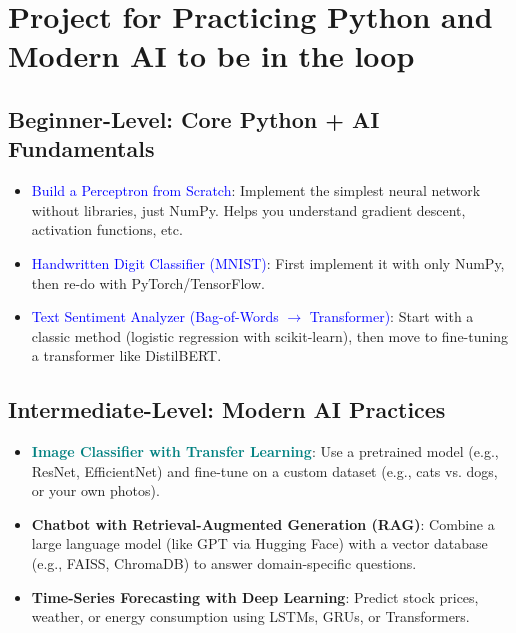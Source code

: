 \documentclass{article}
\begin{document}
\section{Project for Practicing Python and Modern AI to be in the loop}

\subsection*{Beginner-Level: Core Python + AI Fundamentals}
\begin{itemize}
    \item \textcolor{blue}{Build a Perceptron from Scratch}: Implement the simplest neural network without libraries, just NumPy. Helps you understand gradient descent, activation functions, etc.
    \item \textcolor{blue}{Handwritten Digit Classifier (MNIST)}: First implement it with only NumPy, then re-do with PyTorch/TensorFlow.
    \item \textcolor{blue}{Text Sentiment Analyzer (Bag-of-Words $\rightarrow$ Transformer)}: Start with a classic method (logistic regression with scikit-learn), then move to fine-tuning a transformer like DistilBERT.
\end{itemize}

\subsection*{Intermediate-Level: Modern AI Practices}
\begin{itemize}
    \item {\textbf{\textcolor{teal}{Image Classifier with Transfer Learning}}}: Use a pretrained model (e.g., ResNet, EfficientNet) and fine-tune on a custom dataset (e.g., cats vs. dogs, or your own photos).
    \item \textbf{Chatbot with Retrieval-Augmented Generation (RAG)}: Combine a large language model (like GPT via Hugging Face) with a vector database (e.g., FAISS, ChromaDB) to answer domain-specific questions.
    \item \textbf{Time-Series Forecasting with Deep Learning}: Predict stock prices, weather, or energy consumption using LSTMs, GRUs, or Transformers.
\end{itemize}
\end{document}
